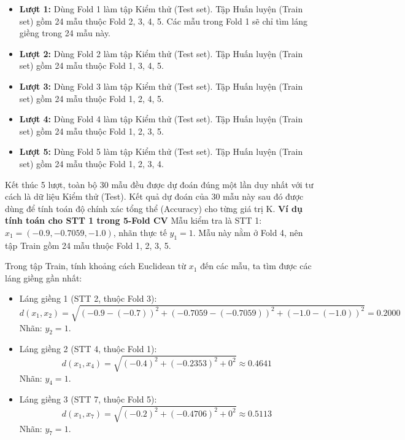 \documentclass[12pt,a4paper]{article}
\begin{document}
\begin{itemize}
    \item \textbf{Lượt 1:} Dùng Fold 1 làm tập Kiểm thử (Test set). Tập Huấn luyện (Train set) gồm 24 mẫu thuộc Fold 2, 3, 4, 5. Các mẫu trong Fold 1 sẽ chỉ tìm láng giềng trong 24 mẫu này.
    \item \textbf{Lượt 2:} Dùng Fold 2 làm tập Kiểm thử (Test set). Tập Huấn luyện (Train set) gồm 24 mẫu thuộc Fold 1, 3, 4, 5.
    \item \textbf{Lượt 3:} Dùng Fold 3 làm tập Kiểm thử (Test set). Tập Huấn luyện (Train set) gồm 24 mẫu thuộc Fold 1, 2, 4, 5.
    \item \textbf{Lượt 4:} Dùng Fold 4 làm tập Kiểm thử (Test set). Tập Huấn luyện (Train set) gồm 24 mẫu thuộc Fold 1, 2, 3, 5.
    \item \textbf{Lượt 5:} Dùng Fold 5 làm tập Kiểm thử (Test set). Tập Huấn luyện (Train set) gồm 24 mẫu thuộc Fold 1, 2, 3, 4.
\end{itemize}

Kết thúc 5 lượt, toàn bộ 30 mẫu đều được dự đoán đúng một lần duy nhất với tư cách là dữ liệu Kiểm thử (Test). Kết quả dự đoán của 30 mẫu này sau đó được dùng để tính toán độ chính xác tổng thể (Accuracy) cho từng giá trị K.
\textbf{Ví dụ tính toán cho STT 1 trong 5-Fold CV}
Mẫu kiểm tra là STT 1: $x_1 = (-0.9, -0.7059, -1.0)$, nhãn thực tế $y_1 = 1$. Mẫu này nằm ở Fold 4, nên tập Train gồm 24 mẫu thuộc Fold 1, 2, 3, 5.

Trong tập Train, tính khoảng cách Euclidean từ $x_1$ đến các mẫu, ta tìm được các láng giềng gần nhất:
\begin{itemize}
    \item Láng giềng 1 (STT 2, thuộc Fold 3): 
    $$d(x_1, x_2) = \sqrt{(-0.9 - (-0.7))^2 + (-0.7059 - (-0.7059))^2 + (-1.0 - (-1.0))^2} = 0.2000$$
    Nhãn: $y_2 = 1$.
    
    \item Láng giềng 2 (STT 4, thuộc Fold 1): 
    $$d(x_1, x_4) = \sqrt{(-0.4)^2 + (-0.2353)^2 + 0^2} \approx 0.4641$$
    Nhãn: $y_4 = 1$.
    
    \item Láng giềng 3 (STT 7, thuộc Fold 5): 
    $$d(x_1, x_7) = \sqrt{(-0.2)^2 + (-0.4706)^2 + 0^2} \approx 0.5113$$
    Nhãn: $y_7 = 1$.
\end{itemize}
\end{document}
